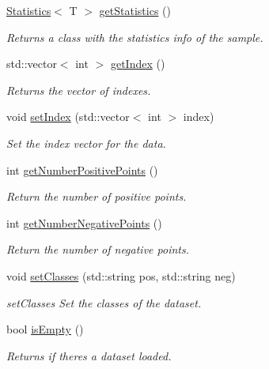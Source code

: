 \begin{DoxyCompactItemize}
\mbox{\hyperlink{class_statistics}{Statistics}}$<$ T $>$ \mbox{\hyperlink{class_data_a7ca936cd8cbde912283f5feee441717a}{get\+Statistics}} ()
\begin{DoxyCompactList}\small\item\em Returns a class with the statistics info of the sample. \end{DoxyCompactList}\item 
std\+::vector$<$ int $>$ \mbox{\hyperlink{class_data_a9f64e56cea5be1f29eea9319716a3ed1}{get\+Index}} ()
\begin{DoxyCompactList}\small\item\em Returns the vector of indexes. \end{DoxyCompactList}\item 
void \mbox{\hyperlink{class_data_a3e03ebfa95d7d90d4ee3b024af7b18de}{set\+Index}} (std\+::vector$<$ int $>$ index)
\begin{DoxyCompactList}\small\item\em Set the index vector for the data. \end{DoxyCompactList}\item 
int \mbox{\hyperlink{class_data_a627911f72bc1ccc3a096b531772ccb8c}{get\+Number\+Positive\+Points}} ()
\begin{DoxyCompactList}\small\item\em Return the number of positive points. \end{DoxyCompactList}\item 
int \mbox{\hyperlink{class_data_a9494572e8a2bc92fb4c10087cf35e4be}{get\+Number\+Negative\+Points}} ()
\begin{DoxyCompactList}\small\item\em Return the number of negative points. \end{DoxyCompactList}\item 
void \mbox{\hyperlink{class_data_a6d29f9fc923c3f7c258b93330130f056}{set\+Classes}} (std\+::string pos, std\+::string neg)
\begin{DoxyCompactList}\small\item\em set\+Classes Set the classes of the dataset. \end{DoxyCompactList}\item 
bool \mbox{\hyperlink{class_data_a8b96bf083edf16dd41031c254d32e143}{is\+Empty}} ()
\begin{DoxyCompactList}\small\item\em Returns if there\textquotesingle{}s a dataset loaded. \end{DoxyCompactList}\item 

\end{DoxyCompactItemize}
